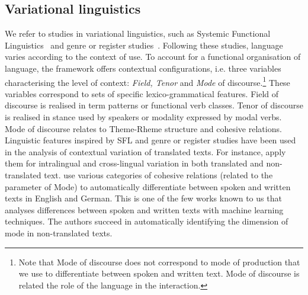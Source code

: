 \documentclass[output=paper,colorlinks,citecolor=brown]{langscibook}
\begin{document}
\subsection{Variational linguistics}\label{ssec:variationalinguistics}
\largerpage
We refer to studies in variational linguistics, such as Systemic Functional Linguistics~\citep[SFL,][]{Halliday2004,HallidayMatthiessen2014} and genre or register studies~\citep{Biber1995,neumann2013contrastive}. Following these studies, language varies according to the context of use. To account for a functional organisation of language, the framework offers contextual configurations, i.e. three
variables characterising the level of context: \textit{Field, Tenor} and \textit{Mode} of discourse.\footnote{Note that Mode of discourse does not correspond to mode of production that we use to differentiate between spoken and written text. Mode of discourse is related the role of the language in the interaction.} These variables correspond to sets
of specific lexico-grammatical features. Field of discourse is realised in term patterns or functional verb classes. Tenor of discourse is realised in stance used by speakers or modality expressed by modal verbs. Mode of discourse relates to Theme-Rheme structure and cohesive relations.
Linguistic features inspired by SFL and genre or register studies have been used in the analysis of contextual variation of translated texts. For instance, \citet{EvertNeumann2017} apply them for intralingual %
and cross-lingual variation in both translated and non-translated text. %
\citet{LapshinovaMartinez2017} use various categories of cohesive relations (related to the parameter of Mode) to automatically differentiate between spoken and written texts in English and German. This is one of the few works known to us that analyses differences between spoken and written texts with machine learning techniques. The authors succeed in automatically identifying the dimension of mode in non-translated texts.
\end{document}
